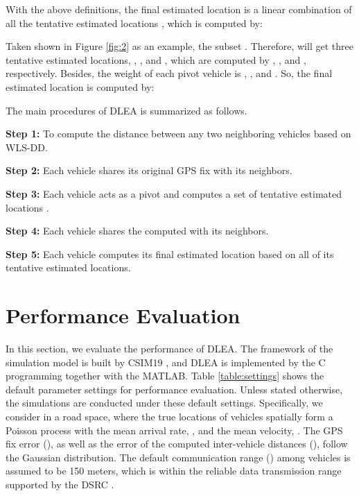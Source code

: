 \documentclass[letterpaper, 10 pt, conference]{ieeeconf}
\begin{document}
With the above definitions, the final estimated location  is a linear combination of all the tentative estimated locations , which is computed by:



Taken   shown in Figure \ref{fig:2} as an example, the subset . Therefore,  will get three tentative estimated locations, ,  , and , which are computed by , , and , respectively. Besides, the weight of each pivot vehicle is , , and . So, the final estimated location is computed by:


The main procedures of  DLEA  is summarized as follows.

\textbf{Step 1:} To compute the distance between any two neighboring vehicles based on WLS-DD.

\vspace{0.3em}

\textbf{Step 2:} Each vehicle  shares its original GPS fix  with its neighbors.

\vspace{0.3em}

\textbf{Step 3:} Each vehicle  acts as a pivot and computes a set of tentative estimated locations .

\vspace{0.3em}

\textbf{Step 4:} Each vehicle   shares the computed  with its neighbors.

\vspace{0.3em}

\textbf{Step 5:} Each vehicle   computes its final estimated location  based on all of its tentative estimated locations.



\section{Performance Evaluation}\label{pe}
In this section, we evaluate the performance of DLEA. The framework of the simulation model is built by CSIM19 \cite{schwetman2001csim19}, and DLEA is implemented by the C programming together with the MATLAB. Table \ref{table:settings} shows the default parameter settings for  performance evaluation. Unless stated otherwise, the simulations are conducted under these default settings. Specifically, we consider in a   road space, where the true locations of vehicles spatially form a Poisson process with the mean arrival rate, , and the mean velocity, . The GPS fix error (), as well as the error of the computed inter-vehicle distances (), follow the Gaussian distribution.  The default  communication range () among vehicles is assumed to be 150 meters, which is within the reliable data transmission range supported by the DSRC \cite{ma2012design}.
\end{document}
